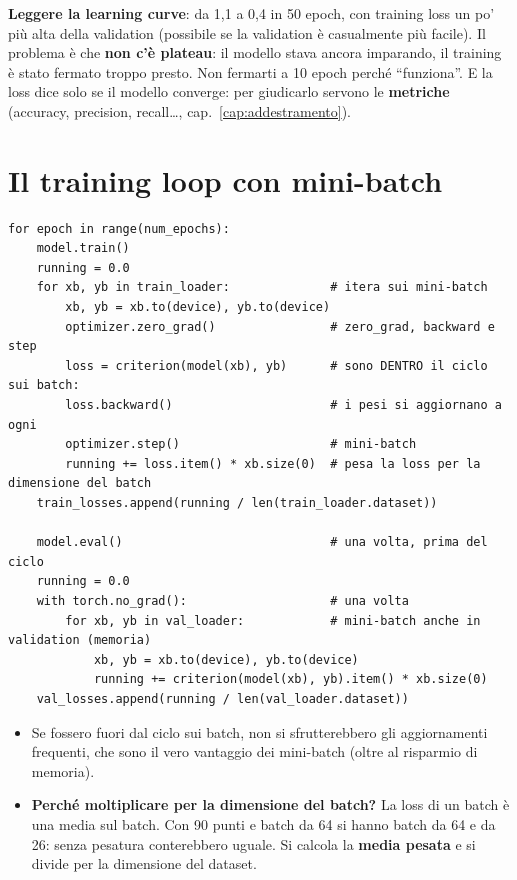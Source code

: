 \textbf{Leggere la learning curve}: da 1,1 a 0,4 in 50 epoch, con training loss un po' più alta della validation (possibile se
la validation è casualmente più facile). Il problema è che \textbf{non c'è plateau}: il modello stava ancora imparando, il
training è stato fermato troppo presto. Non fermarti a 10 epoch perché ``funziona''. E la loss dice solo se il modello
converge: per giudicarlo servono le \textbf{metriche} (accuracy, precision, recall\ldots, cap.~\ref{cap:addestramento}).

\section{Il training loop con mini-batch}
\begin{lstlisting}
for epoch in range(num_epochs):
    model.train()
    running = 0.0
    for xb, yb in train_loader:              # itera sui mini-batch
        xb, yb = xb.to(device), yb.to(device)
        optimizer.zero_grad()                # zero_grad, backward e step
        loss = criterion(model(xb), yb)      # sono DENTRO il ciclo sui batch:
        loss.backward()                      # i pesi si aggiornano a ogni
        optimizer.step()                     # mini-batch
        running += loss.item() * xb.size(0)  # pesa la loss per la dimensione del batch
    train_losses.append(running / len(train_loader.dataset))

    model.eval()                             # una volta, prima del ciclo
    running = 0.0
    with torch.no_grad():                    # una volta
        for xb, yb in val_loader:            # mini-batch anche in validation (memoria)
            xb, yb = xb.to(device), yb.to(device)
            running += criterion(model(xb), yb).item() * xb.size(0)
    val_losses.append(running / len(val_loader.dataset))
\end{lstlisting}
\begin{itemize}
  \item Se  fossero fuori dal ciclo sui batch, non si sfrutterebbero gli aggiornamenti frequenti, che
        sono il vero vantaggio dei mini-batch (oltre al risparmio di memoria).
  \item \textbf{Perché moltiplicare per la dimensione del batch?} La loss di un batch è una media sul batch. Con 90 punti e batch da 64
        si hanno batch da 64 e da 26: senza pesatura conterebbero uguale. Si calcola la \textbf{media pesata} e si divide per la
        dimensione del dataset.
\end{itemize}


